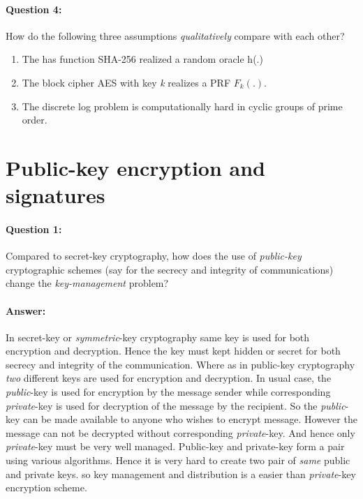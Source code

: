 \documentclass{article}
\begin{document}
    \paragraph{Question 4:} How do the following three assumptions \emph{qualitatively} compare with each other?
    \begin{enumerate}
        \item The has function SHA-256 realized a random oracle h(.)
        \item The block cipher AES with key \emph{k} realizes a PRF $F_k(.)$.
        \item The discrete log problem is computationally hard in cyclic groups of prime order.
    \end{enumerate}
        
\section{Public-key encryption and signatures}
    \paragraph{Question 1:} Compared to secret-key cryptography, how does the use of \emph{public-key} cryptographic schemes (say for the secrecy and integrity of communications) change the \emph{key-management} problem?
    \paragraph{Answer: \newline}
        In secret-key or \emph{symmetric}-key cryptography same key is used for both encryption and decryption. Hence the key must kept hidden or secret for both secrecy and integrity of the communication. \newline
        Where as in public-key cryptography \emph{two} different keys are used for encryption and decryption. In usual case, the \emph{public}-key is used for encryption by the message sender while corresponding \emph{private}-key is used for decryption of the message by the recipient. So the \emph{public}-key can be made available to anyone who wishes to encrypt message. However the message can not be decrypted without corresponding \emph{private}-key. And hence only \emph{private}-key must be very well managed.\newline
        Public-key and private-key form a pair using various algorithms. Hence it is very hard to create two pair of \emph{same} public and private keys. so key management and distribution is a easier than \emph{private}-key encryption scheme.
        
\end{document}
